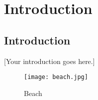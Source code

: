 \chapter*{Introduction}
\label{ch:introduction}

\section*{Introduction}

[Your introduction goes here.]

\begin{figure}[h]
    \centering
    \texttt{[image: beach.jpg]}
    \caption{Beach}
    \label{fig:beach}
\end{figure}

